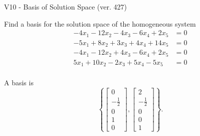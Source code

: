 \begin{exercise}
  \begin{exerciseTitle}V10 - Basis of Solution Space (ver. 427)\end{exerciseTitle}
  \begin{exerciseStatement}
    Find a basis for the solution space of the homogeneous system 
\begin{align*}
 -4 x_ 1 -12 x_ 2 -4 x_ 3 -6 x_ 4 + 2 x_ 5 &= 0  \\ 
  -5 x_ 1 + 8 x_ 2 + 3 x_ 3 + 4 x_ 4 + 14 x_ 5 &= 0  \\ 
  -4 x_ 1 -12 x_ 2 + 4 x_ 3 -6 x_ 4 + 2 x_ 5 &= 0  \\ 
  5 x_ 1 + 10 x_ 2 -2 x_ 3 + 5 x_ 4 -5 x_ 5 &= 0  \\ 
 \end{align*}


 
  \end{exerciseStatement}

  \begin{exerciseAnswer}
   A basis is   
\[\left\{\left[\begin{array}{c}
0 \\
-\frac{1}{2} \\
0 \\
1 \\
0
\end{array}\right] , \left[\begin{array}{c}
2 \\
-\frac{1}{2} \\
0 \\
0 \\
1
\end{array}\right]\right\}.\]

  


  \end{exerciseAnswer}
\end{exercise}